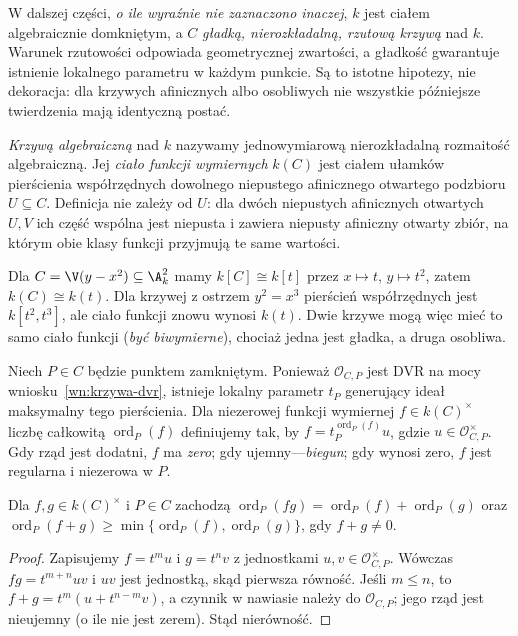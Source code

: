W dalszej części, \emph{o ile wyraźnie nie zaznaczono
inaczej}, $k$ jest ciałem algebraicznie domkniętym,
a $C$ \emph{gładką, nierozkładalną, rzutową krzywą}
nad $k$. Warunek rzutowości odpowiada geometrycznej
zwartości, a gładkość gwarantuje istnienie lokalnego
parametru w każdym punkcie. Są to istotne hipotezy,
nie dekoracja: dla krzywych afinicznych albo osobliwych
nie wszystkie późniejsze twierdzenia mają identyczną postać.

\begin{definicja}
\emph{Krzywą algebraiczną} nad $k$ nazywamy
jednowymiarową nierozkładalną rozmaitość algebraiczną.
Jej \emph{ciało funkcji wymiernych} $k(C)$ jest
ciałem ułamków pierścienia współrzędnych dowolnego
niepustego afinicznego otwartego podzbioru $U\subseteq C$.
Definicja nie zależy od $U$: dla dwóch niepustych
afinicznych otwartych $U,V$ ich część wspólna jest
niepusta i zawiera niepusty afiniczny otwarty zbiór,
na którym obie klasy funkcji przyjmują te same wartości.
\end{definicja}

\begin{przyklad}
Dla $C=\V(y-x^2)\subseteq\A^2_k$ mamy
$k[C]\cong k[t]$ przez $x\mapsto t$, $y\mapsto t^2$,
zatem $k(C)\cong k(t)$. Dla krzywej z ostrzem
$y^2=x^3$ pierścień współrzędnych jest
$k[t^2,t^3]$, ale ciało funkcji znowu wynosi $k(t)$.
Dwie krzywe mogą więc mieć to samo ciało funkcji
(\emph{być biwymierne}), chociaż jedna jest gładka,
a druga osobliwa.
\end{przyklad}

\begin{definicja}
\label{def:ord}
Niech $P\in C$ będzie punktem zamkniętym.
Ponieważ $\mathcal O_{C,P}$ jest DVR na mocy
wniosku~\ref{wn:krzywa-dvr}, istnieje lokalny parametr
$t_P$ generujący ideał maksymalny tego pierścienia.
Dla niezerowej funkcji wymiernej $f\in k(C)^\times$
liczbę całkowitą $\operatorname{ord}_P(f)$ definiujemy
tak, by $f=t_P^{\operatorname{ord}_P(f)}u$,
gdzie $u\in\mathcal O_{C,P}^\times$.
Gdy rząd jest dodatni, $f$ ma \emph{zero}; gdy
ujemny---\emph{biegun}; gdy wynosi zero, $f$
jest regularna i niezerowa w $P$.
\end{definicja}

\begin{stwierdzenie}
Dla $f,g\in k(C)^\times$ i $P\in C$ zachodzą
$\operatorname{ord}_P(fg)=\operatorname{ord}_P(f)+
\operatorname{ord}_P(g)$ oraz
$\operatorname{ord}_P(f+g)\ge\min
\{\operatorname{ord}_P(f),\operatorname{ord}_P(g)\}$,
gdy $f+g\ne0$.
\end{stwierdzenie}
\begin{proof}
Zapisujemy $f=t^m u$ i $g=t^n v$ z jednostkami
$u,v\in\mathcal O_{C,P}^\times$. Wówczas
$fg=t^{m+n}uv$ i $uv$ jest jednostką, skąd
pierwsza równość. Jeśli $m\le n$, to
$f+g=t^m(u+t^{n-m}v)$, a czynnik w nawiasie
należy do $\mathcal O_{C,P}$; jego rząd jest
nieujemny (o ile nie jest zerem). Stąd nierówność.
\end{proof}

